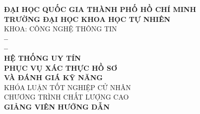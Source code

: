 
\begin{titlepage}
  \begin{center}
    {\large \textbf{ĐẠI HỌC QUỐC GIA THÀNH PHỐ HỒ CHÍ MINH}} \\
    \smallskip
    {\large \textbf{TRƯỜNG ĐẠI HỌC KHOA HỌC TỰ NHIÊN}} \\
    \medskip
    KHOA: CÔNG NGHỆ THÔNG TIN \\[1.8cm]

    {\Large \bfseries \studentonename{} -- \studentoneid} \\
    {\Large \bfseries \studenttwoname{} -- \studenttwoid} \\[1.8cm]

    {\huge \bfseries HỆ THỐNG UY TÍN \\ PHỤC VỤ XÁC THỰC HỒ SƠ \\[3mm] VÀ ĐÁNH GIÁ KỸ NĂNG} \\[2cm]

    {\large KHÓA LUẬN TỐT NGHIỆP CỬ NHÂN} \\
    {\large CHƯƠNG TRÌNH CHẤT LƯỢNG CAO} \\[2cm]

    {\Large \textbf{GIẢNG VIÊN HƯỚNG DẪN}} \\
    \medskip
    {\large \advisorfulltitle} \\

    \vfill
  \end{center}
\end{titlepage}

\restoregeometry